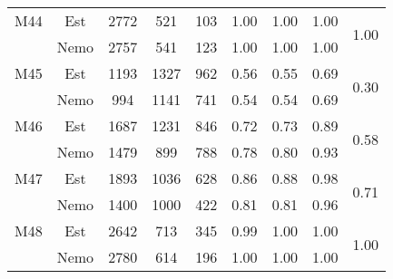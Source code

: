 \begin{longtable}{c c c c c c c c c}
  \midrule
  M44 & Est & 2772 & 521 & 103 & 1.00 & 1.00 & 1.00 & \multirow{2}{*}{1.00} \\
      & Nemo & 2757 & 541 & 123 & 1.00 & 1.00 & 1.00 & \\
  M45 & Est & 1193 & 1327 & 962 & 0.56 & 0.55 & 0.69 & \multirow{2}{*}{0.30} \\
      & Nemo & 994 & 1141 & 741 & 0.54 & 0.54 & 0.69 & \\
  M46 & Est & 1687 & 1231 & 846 & 0.72 & 0.73 & 0.89 & \multirow{2}{*}{0.58} \\
      & Nemo & 1479 & 899 & 788 & 0.78 & 0.80 & 0.93 & \\
  M47 & Est & 1893 & 1036 & 628 & 0.86 & 0.88 & 0.98 & \multirow{2}{*}{0.71} \\
      & Nemo & 1400 & 1000 & 422 & 0.81 & 0.81 & 0.96 & \\
  M48 & Est & 2642 & 713 & 345 & 0.99 & 1.00 & 1.00 & \multirow{2}{*}{1.00} \\
      & Nemo & 2780 & 614 & 196 & 1.00 & 1.00 & 1.00 & \\
  \bottomrule
\end{longtable}

\normalsize

